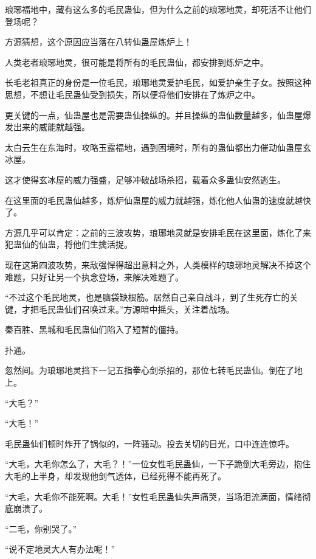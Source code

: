 
\begin{this_body}



琅琊福地中，藏有这么多的毛民蛊仙，但为什么之前的琅琊地灵，却死活不让他们登场呢？

方源猜想，这个原因应当落在八转仙蛊屋炼炉上！

人类老者琅琊地灵，很可能是将所有的毛民蛊仙，都安排到炼炉之中。

长毛老祖真正的身份是一位毛民，琅琊地灵爱护毛民，如爱护亲生子女。按照这种思想，不想让毛民蛊仙受到损失，所以便将他们安排在了炼炉之中。

更关键的一点，仙蛊屋也是需要蛊仙操纵的。并且操纵的蛊仙数量越多，仙蛊屋爆发出来的威能就越强。

太白云生在东海时，攻略玉露福地，遇到困境时，所有的蛊仙都出力催动仙蛊屋玄冰屋。

这才使得玄冰屋的威力强盛，足够冲破战场杀招，载着众多蛊仙安然逃生。

在这里面的毛民蛊仙越多，炼炉仙蛊屋的威力就越强，炼化他人仙蛊的速度就越快了。

方源几乎可以肯定：之前的三波攻势，琅琊地灵就是安排毛民在这里面，炼化了来犯蛊仙的仙蛊，将他们生擒活捉。

现在这第四波攻势，来敌强悍得超出意料之外，人类模样的琅琊地灵解决不掉这个难题，只好让另一个执念登场，来解决难题了。

“不过这个毛民地灵，也是脑袋缺根筋。居然自己亲自战斗，到了生死存亡的关键，才把毛民蛊仙们召唤过来。”方源暗中摇头，关注着战场。

秦百胜、黑城和毛民蛊仙们陷入了短暂的僵持。

扑通。

忽然间。为琅琊地灵挡下一记五指拳心剑杀招的，那位七转毛民蛊仙。倒在了地上。

“大毛？”

“大毛！”

毛民蛊仙们顿时炸开了锅似的，一阵骚动。投去关切的目光，口中连连惊呼。

“大毛，大毛你怎么了，大毛？！”一位女性毛民蛊仙，一下子跪倒大毛旁边，抱住大毛的上半身，却发现他剑气透体，已经死得不能再死了。

“大毛，大毛你不能死啊。大毛！”女性毛民蛊仙失声痛哭，当场泪流满面，情绪彻底崩溃了。

“二毛，你别哭了。”

“说不定地灵大人有办法呢！”


\end{this_body}
